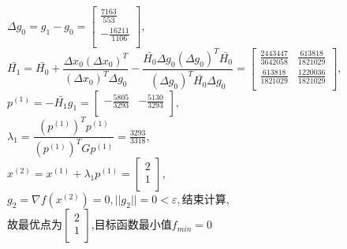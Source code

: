 \begin{solution}
    $\Delta g_0=g_1-g_0=\begin{bmatrix} \frac{7163}{553}\\-\frac{16211}{1106}\\\end{bmatrix}$,\\
    $\bar{H_1}=\bar{H_0}+\dfrac{\Delta x_0(\Delta x_0)^T}{(\Delta x_0)^T\Delta g_0}-\dfrac{\bar{H_0}\Delta g_0(\Delta g_0)^T\bar{H_0}}{(\Delta g_0)^T\bar{H_0}\Delta g_0}=\begin{bmatrix}
        \frac{2443447}{3642058}&\frac{613818}{1821029}\\
        \frac{613818}{1821029}&\frac{1220036}{1821029}\\\end{bmatrix}$,\\
    $p^{(1)}=-\bar{H_1}g_1=\begin{bmatrix}        -\frac{5805}{3293}&-\frac{5130}{3293}\\\end{bmatrix}$,\\
    $\lambda_1=\dfrac{(p^{(1)})^Tp^{(1)}}{(p^{(1)})^TGp^{(1)}}=\frac{3293}{3318}$,\\
    $x^{(2)}=x^{(1)}+\lambda_1p^{(1)}=\begin{bmatrix} 2\\1\\\end{bmatrix}$,\\
    $g_2=\nabla f(x^{(2)})=0,||g_2||=0<\varepsilon,\text{结束计算}$,\\
    故最优点为$\begin{bmatrix} 2\\1\\\end{bmatrix}$,目标函数最小值$f_{min}=0$
\end{solution}

